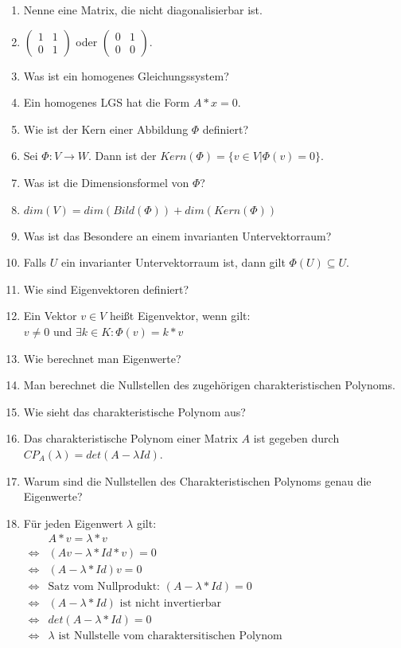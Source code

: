 \documentclass[11pt,parskip=full]{scrartcl}
\newcommand{\answer}{\item[\textbf{Antwort}]}
\begin{document}
\begin{enumerate}[label=\textbf{\arabic*. Frage}]
		\item Nenne eine Matrix, die nicht diagonalisierbar ist.
		\answer \(\begin{pmatrix} 1 & 1 \\ 0 & 1 \end{pmatrix}\) oder \(\begin{pmatrix} 0 & 1 \\ 0 & 0 \end{pmatrix}\).
		
		\item Was ist ein homogenes Gleichungssystem?
		\answer Ein homogenes LGS hat die Form $A*x=0$.
		
		\item Wie ist der Kern einer Abbildung $\Phi$ definiert?
		\answer Sei \(\Phi : V \rightarrow W\). Dann ist der \(Kern(\Phi) = \{v \in V | \Phi(v) = 0\}\).
		
		\item Was ist die Dimensionsformel von $\Phi$?
		\answer \(dim(V) = dim(Bild(\Phi)) + dim(Kern(\Phi))\)
		
		\item Was ist das Besondere an einem invarianten Untervektorraum?
		\answer Falls $U$ ein invarianter Untervektorraum ist, dann gilt \(\Phi(U) \subseteq U\).
		
		\item Wie sind Eigenvektoren definiert?
		\answer Ein Vektor \(v \in V\) heißt Eigenvektor, wenn gilt: \\
		\(v \neq 0\) und \(\exists k \in K: \Phi(v) = k*v\)
		
		\item Wie berechnet man Eigenwerte?
		\answer Man berechnet die Nullstellen des zugehörigen charakteristischen Polynoms.
		
		\item Wie sieht das charakteristische Polynom aus?
		\answer Das charakteristische Polynom einer Matrix $A$ ist gegeben durch \(CP_{A}(\lambda) = det(A-\lambda Id)\).
		
		\item Warum sind die Nullstellen des Charakteristischen Polynoms genau die Eigenwerte?
		\answer Für jeden Eigenwert $\lambda$ gilt:\\
		\(\begin{aligned}
		&A*v = \lambda*v \\
		\iff &(Av - \lambda*Id*v) = 0 \\
		\iff &(A - \lambda*Id)v = 0 \\
		\iff &\text{Satz vom Nullprodukt: } (A - \lambda*Id) = 0 \\
		\iff &(A - \lambda *Id) \text{ ist nicht invertierbar} \\
		\iff &det(A - \lambda*Id) = 0 \\
		\iff &\lambda \text{ ist Nullstelle vom charaktersitischen Polynom}
		\end{aligned}\)
		

\end{enumerate}
\end{document}

